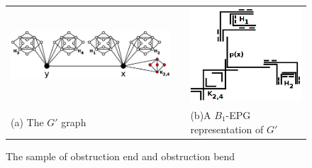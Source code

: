 \begin{figure}[h]
  \centering
  \begin{tabular}{p{10cm} p{1cm} p{5cm}}
     \includegraphics[width=10cm, center]{./img/obstrucaoDobraObstrucaoExtremidade2.eps} & &\includegraphics[width=5cm, center]{./img/extremidadeDobraObstruida.png}  \\%
    \footnotesize \centering (a) The $G'$ graph& & \footnotesize \centering (b)A $B_1$-EPG representation of $G'$%
  \end{tabular}
 \caption{The sample of obstruction  end and obstruction bend}\label{fig:extremidadeDobraObstruida2}
\end{figure}